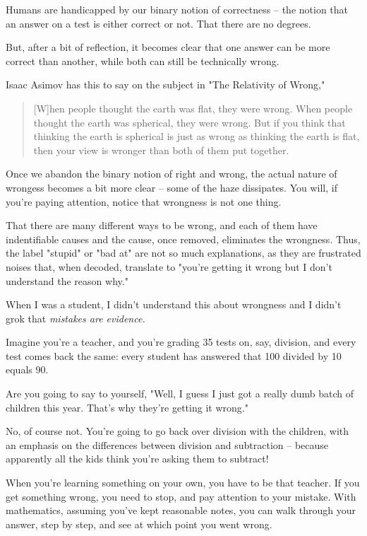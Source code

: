 Humans are handicapped by our binary notion of correctness -- the notion that an
answer on a test is either correct or not. That there are no degrees.

But, after a bit of reflection, it becomes clear that one answer can be more
correct than another, while both can still be technically wrong.

Isaac Asimov has this to say on the subject in "The Relativity of Wrong,"

\begin{quote}
[W]hen people thought the earth was flat, they were wrong. When people thought
the earth was spherical, they were wrong. But if you think that thinking the
earth is spherical is just as wrong as thinking the earth is flat, then your
view is wronger than both of them put together.
\end{quote}
  
Once we abandon the binary notion of right and wrong, the actual nature of
wrongess becomes a bit more clear -- some of the haze dissipates. You will, if
you're paying attention, notice that wrongness is not one thing.

That there are many different ways to be wrong, and each of them have
indentifiable causes and the cause, once removed, eliminates the
wrongness. Thus, the label "stupid" or "bad at" are not so much explanations, as
they are frustrated noises that, when decoded, translate to "you're getting it
wrong but I don't understand the reason why."

When I was a student, I didn't understand this about wrongness and I didn't grok
that \textit{mistakes are evidence.}

Imagine you're a teacher, and you're grading 35 tests on, say, division,
and every test comes back the same: every student has answered that 100 divided
by 10 equals 90.

Are you going to say to yourself, "Well, I guess I just got a really dumb batch
of children this year. That's why they're getting it wrong."

No, of course not. You're going to go back over division with the children, with
an emphasis on the differences between division and subtraction -- because
apparently all the kids think you're asking them to subtract!

When you're learning something on your own, you have to be that teacher. If you
get something wrong, you need to stop, and pay attention to your mistake. With
mathematics, assuming you've kept reasonable notes, you can walk through your
answer, step by step, and see at which point you went wrong.

